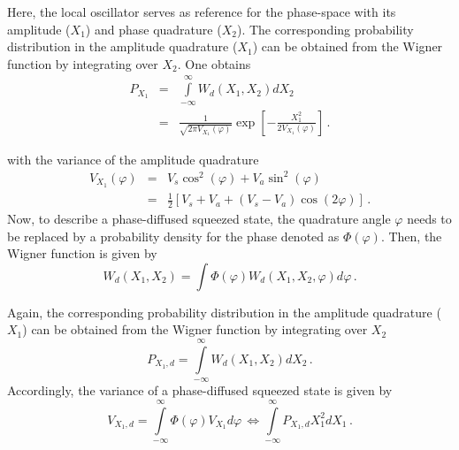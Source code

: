 Here, the local oscillator serves as reference for the phase-space with its amplitude ($X_1$) and phase quadrature ($X_2$). The corresponding probability distribution in the amplitude quadrature ($X_1$) can be obtained from the Wigner function by integrating over $X_2$. One obtains
\begin{eqnarray}
P_{X_1} &=& \int\limits_ {-\infty}^{\infty}W_d(X_1,X_2)dX_2\\
&=&\frac{1}{{\sqrt{2\pi V_{X_1}(\varphi)}}}\exp\left[-\frac{X_1^2}{2V_{X_1}(\varphi)} \right]\,.
\end{eqnarray}

with the variance of the amplitude quadrature
\begin{eqnarray}
V_{X_1}(\varphi) &=& V_s\cos^2(\varphi) + V_a\sin^2(\varphi)\\
&=&\frac{1}{2}\left[V_s+V_a+(V_s-V_a)\cos(2\varphi)\right]\,.
\end{eqnarray}
Now, to describe a phase-diffused squeezed state, the quadrature angle $\varphi$ needs to be replaced by a probability density for the phase denoted as $\Phi(\varphi)$. Then, the Wigner function is given by
\begin{equation}
W_d(X_1,X_2) =\int \Phi(\varphi) W_d(X_1,X_2, \varphi)d\varphi\,.
\end{equation}

Again, the corresponding probability distribution in the amplitude quadrature ($X_1$) can be obtained from the Wigner function by integrating over $X_2$
\begin{equation}
P_{X_1,d} = \int\limits_ {-\infty}^{\infty}W_d(X_1,X_2)dX_2 \,.
\end{equation}
Accordingly, the variance of a phase-diffused squeezed state is given by
\begin{equation}
V_{X_1,d} = \int\limits_{-\infty}^{\infty}\Phi(\varphi)V_{X_1}d\varphi\,\Leftrightarrow  \int\limits_{-\infty}^{\infty}P_{X_1,d}X_1^2dX_1\,.\label{eq:varsqzphsdiff}
\end{equation}


